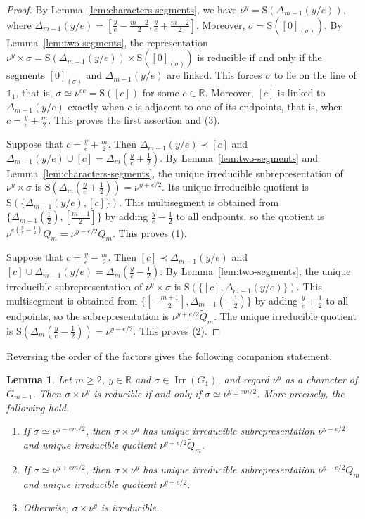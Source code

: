 \documentclass[11pt]{amsart}
\numberwithin{equation}{section}
\theoremstyle{plain}
\newtheorem{lemma}[theorem]{Lemma}
\theoremstyle{definition}
\theoremstyle{remark}
\newcommand{\R}{\mathbb{R}}
\newcommand{\one}{\mathds{1}}
\DeclareMathOperator{\Irr}{Irr}
\newcommand{\Qt}{\widetilde{Q}}
\newcommand{\Ss}{\mathrm{S}}
\begin{document}
\begin{proof}
	By Lemma~\ref{lem:characters-segments}, we have $\nu^y=\Ss(\Delta_{m-1}(y/e))$, where $\Delta_{m-1}(y/e)=[\frac ye-\frac{m-2}2,\frac ye+\frac{m-2}2]$. Moreover, $\sigma=\Ss([0]_{(\sigma)})$. By Lemma~\ref{lem:two-segments}, the representation $\nu^y\times\sigma=\Ss(\Delta_{m-1}(y/e))\times\Ss([0]_{(\sigma)})$ is reducible if and only if the segments $[0]_{(\sigma)}$ and $\Delta_{m-1}(y/e)$ are linked. This forces $\sigma$ to lie on the line of $\one_1$, that is, $\sigma\simeq\nu^{ec}=\Ss([c])$ for some $c\in\R$. Moreover, $[c]$ is linked to $\Delta_{m-1}(y/e)$ exactly when $c$ is adjacent to one of its endpoints, that is, when $c=\frac ye\pm\frac m2$. This proves the first assertion and (3).
	
	Suppose that $c=\frac ye+\frac m2$. Then $\Delta_{m-1}(y/e)\prec[c]$ and $\Delta_{m-1}(y/e)\cup[c]=\Delta_m(\frac ye+\frac12)$. By Lemma~\ref{lem:two-segments} and Lemma~\ref{lem:characters-segments}, the unique irreducible subrepresentation of $\nu^y\times\sigma$ is $\Ss(\Delta_m(\frac ye+\frac12))=\nu^{y+e/2}$. Its unique irreducible quotient is $\Ss(\{\Delta_{m-1}(y/e),[c]\})$. This multisegment is obtained from $\{\Delta_{m-1}(\frac12),[\frac{m+1}2]\}$ by adding $\frac ye-\frac12$ to all endpoints, so the quotient is $\nu^{e(\frac ye-\frac12)}Q_m=\nu^{y-e/2}Q_m$. This proves (1).
	
	Suppose that $c=\frac ye-\frac m2$. Then $[c]\prec\Delta_{m-1}(y/e)$ and $[c]\cup\Delta_{m-1}(y/e)=\Delta_m(\frac ye-\frac12)$. By Lemma~\ref{lem:two-segments}, the unique irreducible subrepresentation of $\nu^y\times\sigma$ is $\Ss(\{[c],\Delta_{m-1}(y/e)\})$. This multisegment is obtained from $\{[-\frac{m+1}2],\Delta_{m-1}(-\frac12)\}$ by adding $\frac ye+\frac12$ to all endpoints, so the subrepresentation is $\nu^{y+e/2}\Qt_m$. The unique irreducible quotient is $\Ss(\Delta_m(\frac ye-\frac12))=\nu^{y-e/2}$. This proves (2).
\end{proof}

Reversing the order of the factors gives the following companion statement.

\begin{lemma}\label{lem:sigma-char}
	Let $m\ge2$, $y\in\R$ and $\sigma\in\Irr(G_1)$, and regard $\nu^y$ as a character of $G_{m-1}$. Then $\sigma\times\nu^y$ is reducible if and only if $\sigma\simeq\nu^{y\pm em/2}$. More precisely, the following hold.
	\begin{enumerate}
		\item If $\sigma\simeq\nu^{y-em/2}$, then $\sigma\times\nu^y$ has unique irreducible subrepresentation $\nu^{y-e/2}$ and unique irreducible quotient $\nu^{y+e/2}\Qt_m$.
		\item If $\sigma\simeq\nu^{y+em/2}$, then $\sigma\times\nu^y$ has unique irreducible subrepresentation $\nu^{y-e/2}Q_m$ and unique irreducible quotient $\nu^{y+e/2}$.
		\item Otherwise, $\sigma\times\nu^y$ is irreducible.
	\end{enumerate}
\end{lemma}
\end{document}
